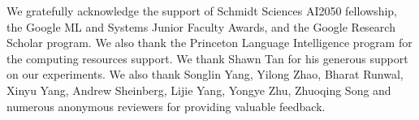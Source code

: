 We gratefully acknowledge the support of Schmidt Sciences AI2050 fellowship, the Google ML and Systems Junior Faculty Awards, and the Google Research Scholar program. We also thank the Princeton Language Intelligence program for the computing resources support. We thank Shawn Tan for his generous support on our experiments. We also thank Songlin Yang, Yilong Zhao, Bharat Runwal, Xinyu Yang, Andrew Sheinberg, Lijie Yang, Yongye Zhu, Zhuoqing Song and numerous anonymous reviewers for providing valuable feedback.

